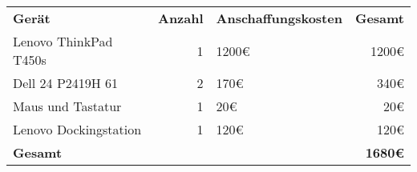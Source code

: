 \begin{tabular}{lrlr}
\rowcolor{heading}\textbf{Gerät} & \textbf{Anzahl} & \textbf{Anschaffungskosten} & \textbf{Gesamt} \\
Lenovo ThinkPad T450s & 1 & 1200€ & 1200€\\
\rowcolor{odd}Dell 24 P2419H 61 & 2 & 170€ & 340€ \\
Maus und Tastatur & 1 & 20€ & 20€ \\
\rowcolor{odd}Lenovo Dockingstation & 1 & 120€ & 120€ \\
\hline
\hline
\rowcolor{odd}\textbf{Gesamt} & & & \textbf{1680€} \\
\end{tabular}